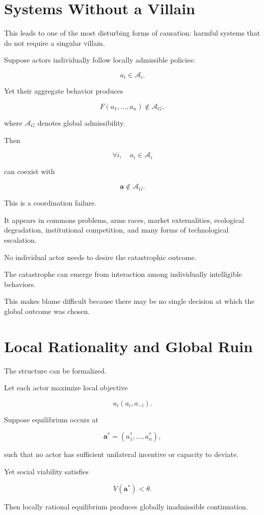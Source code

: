 \documentclass[11pt,oneside]{book}
\theoremstyle{definition}
\theoremstyle{remark}
\newcommand{\A}{\mathcal{A}}
\begin{document}
\section{Systems Without a Villain}

This leads to one of the most disturbing forms of causation: harmful systems that do not require a singular villain.

Suppose actors individually follow locally admissible policies:

\[
a_i\in\A_i.
\]

Yet their aggregate behavior produces

\[
F(a_1,\ldots,a_n)\notin\A_G,
\]

where \(\A_G\) denotes global admissibility.

Then

\[
\forall i,\quad a_i\in\A_i
\]

can coexist with

\[
\mathbf a\notin\A_G.
\]

This is a coordination failure.

It appears in commons problems, arms races, market externalities, ecological degradation, institutional competition, and many forms of technological escalation.

No individual actor needs to desire the catastrophic outcome.

The catastrophe can emerge from interaction among individually intelligible behaviors.

This makes blame difficult because there may be no single decision at which the global outcome was chosen.

\section{Local Rationality and Global Ruin}

The structure can be formalized.

Let each actor maximize local objective

\[
u_i(a_i,a_{-i}).
\]

Suppose equilibrium occurs at

\[
\mathbf a^\ast
=
(a_1^\ast,\ldots,a_n^\ast),
\]

such that no actor has sufficient unilateral incentive or capacity to deviate.

Yet social viability satisfies

\[
V(\mathbf a^\ast)<\theta.
\]

Then locally rational equilibrium produces globally inadmissible continuation.
\end{document}

